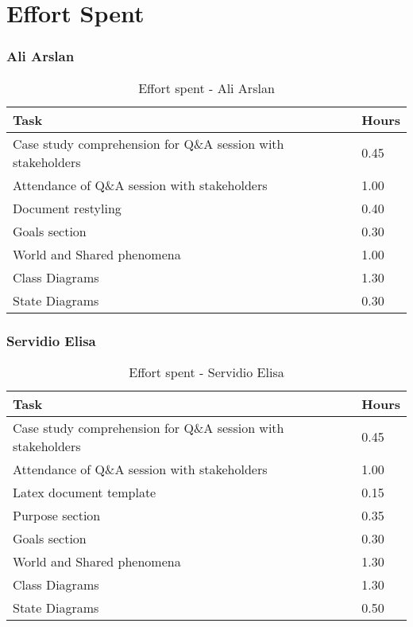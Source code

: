 \chapter{Effort Spent}

\subsection{Ali Arslan}
\renewcommand{\arraystretch}{2}
\begin{longtable}{|m{9cm}|m{1.2cm}|}
\caption{Effort spent - Ali Arslan}\\
\hline
\endfirsthead
\endhead
\hline
\endlastfoot
\rowcolor{white!40!blue!70}
\textbf{Task} & \hfil {\textbf{Hours}}\\
\hline
Case study comprehension for Q\&A session with stakeholders & \hfil 0.45\\
Attendance of Q\&A session with stakeholders & \hfil 1.00\\
Document restyling	& \hfil 0.40\\
Goals section & \hfil 0.30\\
World and Shared phenomena & \hfil 1.00\\
Class Diagrams & \hfil 1.30\\
State Diagrams & \hfil 0.30\\
\hline
\end{longtable}

\subsection{Servidio Elisa}
\renewcommand{\arraystretch}{2}
\begin{longtable}{|m{9cm}|m{1.2cm}|}
\caption{Effort spent - Servidio Elisa}\\
\hline
\endfirsthead
\endhead
\hline
\endlastfoot
\rowcolor{white!40!blue!70}
\textbf{Task} &\hfil {\textbf{Hours}}\\
\hline
Case study comprehension for Q\&A session with stakeholders & \hfil 0.45\\
Attendance of Q\&A session with stakeholders & \hfil 1.00\\
Latex document template & \hfil 0.15\\
Purpose section	& \hfil 0.35\\
Goals section & \hfil 0.30\\
World and Shared phenomena & \hfil 1.30\\
Class Diagrams & \hfil 1.30\\
State Diagrams & \hfil 0.50\\
\hline
\end{longtable}

